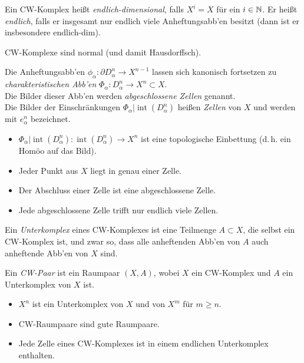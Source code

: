 \documentclass{cheat-sheet}
\newcommand{\inte}{\mathop{\mathrm{int}}} %
\begin{document}
\begin{defn}
  Ein CW-Komplex heißt \emph{endlich-dimensional}, falls $X^i = X$ für ein $i \in \mathbb{N}$. Er heißt \emph{endlich}, falls er insgesamt nur endlich viele Anheftungsabb'en besitzt (dann ist er insbesondere endlich-dim).
\end{defn}

\begin{prop}
  CW-Komplexe sind normal (und damit Hausdorffsch).
\end{prop}

\begin{defn}
  Die Anheftungsabb'en $\phi_\alpha : \partial D^{n}_\alpha \to X^{n-1}$ lassen sich kanonisch fortsetzen zu \emph{charakteristischen Abb'en} $\Phi_\alpha : D^n_\alpha \to X^n \subset X$.\\
  Die Bilder dieser Abb'en werden \emph{abgeschlossene Zellen} genannt.\\
  Die Bilder der Einschränkungen $\Phi_\alpha|\inte(D^n_\alpha)$ heißen \emph{Zellen} von $X$ und werden mit $e^n_\alpha$ bezeichnet.
\end{defn}

\begin{prop}
  \begin{itemize}
    \item $\Phi_\alpha|\inte(D^n_\alpha) : \inte(D^n_\alpha) \to X^n$  ist eine topologische Einbettung (d.\,h. ein Homöo auf das Bild).
    \item Jeder Punkt aus $X$ liegt in genau einer Zelle.
    \item Der Abschluss einer Zelle ist eine abgeschlossene Zelle.
    \item Jede abgeschlossene Zelle trifft nur endlich viele Zellen.
  \end{itemize}
\end{prop}


\begin{defn}
  Ein \emph{Unterkomplex} eines CW-Komplexes ist eine Teilmenge $A \subset X$, die selbst ein CW-Komplex ist, und zwar so, dass alle anheftenden Abb'en von $A$ auch anheftende Abb'en von $X$ sind.
\end{defn}

\begin{defn}
  Ein \emph{CW-Paar} ist ein Raumpaar $(X, A)$, wobei $X$ ein CW-Komplex und $A$ ein Unterkomplex von $X$ ist.
\end{defn}

\begin{prop}
  \begin{itemize}
    \item $X^n$ ist ein Unterkomplex von $X$ und von $X^m$ für $m \geq n$.
    \item CW-Raumpaare sind gute Raumpaare.
    \item Jede Zelle eines CW-Komplexes ist in einem endlichen Unterkomplex enthalten.
  \end{itemize}
\end{prop}
\end{document}
